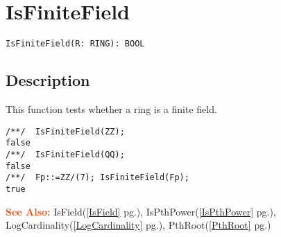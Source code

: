 \documentclass[a4paper]{mybook}
\newenvironment{command}{}{} %
\newcommand\SeeAlso{\par\textcolor{OrangeRed}{\textbf{\large See Also: }}}
\begin{document}
\section{IsFiniteField}
\label{IsFiniteField}
\begin{command} %


\begin{Verbatim}[label=syntax, rulecolor=\color{MidnightBlue},
frame=single]
IsFiniteField(R: RING): BOOL
\end{Verbatim}


\subsection*{Description}

This function tests whether a ring is a finite field.
\begin{Verbatim}[label=example, rulecolor=\color{PineGreen}, frame=single]
/**/  IsFiniteField(ZZ);
false
/**/  IsFiniteField(QQ);
false
/**/  Fp::=ZZ/(7); IsFiniteField(Fp);
true
\end{Verbatim}


\SeeAlso %
  IsField(\ref{IsField} pg.\pageref{IsField}), 
    IsPthPower(\ref{IsPthPower} pg.\pageref{IsPthPower}), 
    LogCardinality(\ref{LogCardinality} pg.\pageref{LogCardinality}), 
    PthRoot(\ref{PthRoot} pg.\pageref{PthRoot})
\end{command} %
\end{document}
